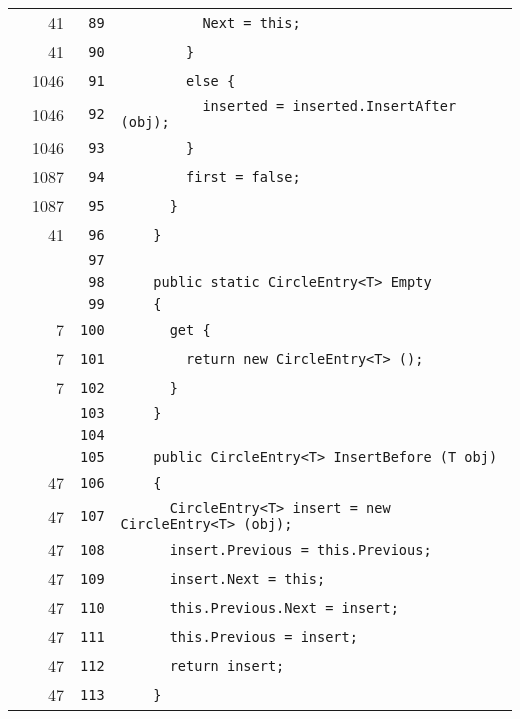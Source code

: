 \documentclass[a4paper,10pt]{article}
\begin{document}
\begin{longtable}[l]{lrrl}
\cellcolor{green} & 41 & \verb~89~ & \verb~          Next = this;~\\
\cellcolor{green} & 41 & \verb~90~ & \verb~        }~\\
\cellcolor{green} & 1046 & \verb~91~ & \verb~        else {~\\
\cellcolor{green} & 1046 & \verb~92~ & \verb~          inserted = inserted.InsertAfter (obj);~\\
\cellcolor{green} & 1046 & \verb~93~ & \verb~        }~\\
\cellcolor{green} & 1087 & \verb~94~ & \verb~        first = false;~\\
\cellcolor{green} & 1087 & \verb~95~ & \verb~      }~\\
\cellcolor{green} & 41 & \verb~96~ & \verb~    }~\\
\cellcolor{gray} &  & \verb~97~ & \verb~~\\
\cellcolor{gray} &  & \verb~98~ & \verb~    public static CircleEntry<T> Empty~\\
\cellcolor{gray} &  & \verb~99~ & \verb~    {~\\
\cellcolor{green} & 7 & \verb~100~ & \verb~      get {~\\
\cellcolor{green} & 7 & \verb~101~ & \verb~        return new CircleEntry<T> ();~\\
\cellcolor{green} & 7 & \verb~102~ & \verb~      }~\\
\cellcolor{gray} &  & \verb~103~ & \verb~    }~\\
\cellcolor{gray} &  & \verb~104~ & \verb~~\\
\cellcolor{gray} &  & \verb~105~ & \verb~    public CircleEntry<T> InsertBefore (T obj)~\\
\cellcolor{green} & 47 & \verb~106~ & \verb~    {~\\
\cellcolor{green} & 47 & \verb~107~ & \verb~      CircleEntry<T> insert = new CircleEntry<T> (obj);~\\
\cellcolor{green} & 47 & \verb~108~ & \verb~      insert.Previous = this.Previous;~\\
\cellcolor{green} & 47 & \verb~109~ & \verb~      insert.Next = this;~\\
\cellcolor{green} & 47 & \verb~110~ & \verb~      this.Previous.Next = insert;~\\
\cellcolor{green} & 47 & \verb~111~ & \verb~      this.Previous = insert;~\\
\cellcolor{green} & 47 & \verb~112~ & \verb~      return insert;~\\
\cellcolor{green} & 47 & \verb~113~ & \verb~    }~\\

\end{longtable}
\end{document}
